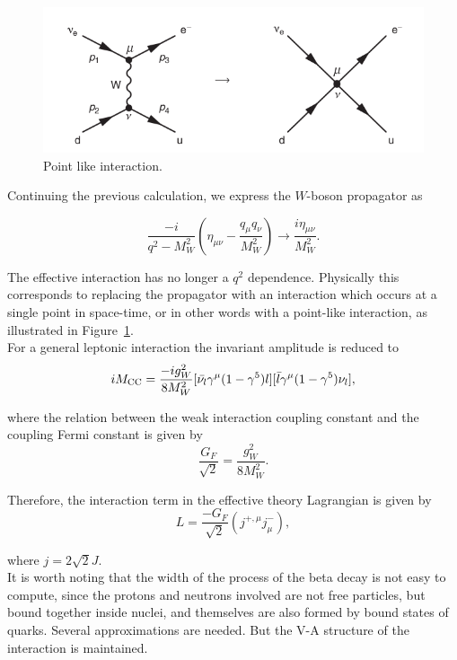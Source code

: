 \documentclass[10pt,swedish, openany]{book}
\begin{document}
\begin{figure}[h]
\includegraphics[scale=0.5]{Fermi.png}
\centering
\caption{Point like interaction.}
\label{fig:PointLikeInteraction}
\end{figure}  

Continuing the previous calculation, we express the $W$-boson propagator as

\begin{equation}
    \frac{-i}{q^2-M^2_W}(\eta_{\mu\nu}-\frac{q_{\mu}q_{\nu}}{M^2_W}) \rightarrow \frac{i \eta_{\mu\nu}}{M^2_W}.
\end{equation}

The effective interaction has no longer a $q^2$ dependence. Physically this corresponds to replacing the propagator with an interaction which occurs at a single point in space-time, or in other words with a point-like interaction, as illustrated in Figure~\ref{fig:PointLikeInteraction}.\\

For a general leptonic interaction the invariant amplitude is reduced to
\begin{equation}
    i M_{\rm CC} = \frac{- i g_W^2}{8M_W^2}[\bar{\nu_l}\gamma^{\mu}(1-\gamma^5)l][\bar{l}\gamma^{\mu}(1-\gamma^5)\nu_l], 
\end{equation}

where the relation between the weak interaction coupling constant and the coupling Fermi constant is given by
\begin{equation}
    \frac{G_F}{\sqrt{2}} = \frac{g_W^2}{8 M_W^2}.
\end{equation} 

Therefore, the interaction term in the effective theory Lagrangian is given by
\begin{equation}
L = \frac{-G_F}{\sqrt{2}}(j^{+,\mu} j^-_{\mu}),
\end{equation}

where $j = 2\sqrt{2} J$. \\

It is worth noting that the width of the process of the beta decay is not easy to compute, since the protons and neutrons involved are not free particles, but bound together inside nuclei, and themselves are also formed by bound states of quarks. Several approximations are needed. But the V-A structure of the interaction is maintained. 
\end{document}
